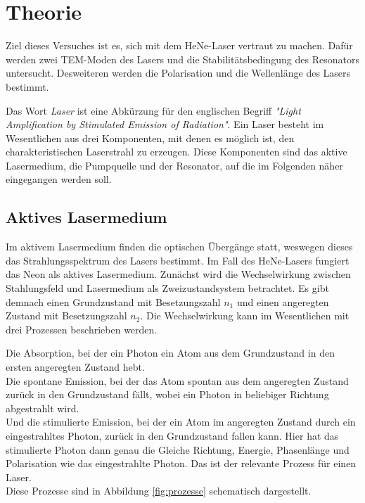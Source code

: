 \section{Theorie}
\label{sec:Theorie}

Ziel dieses Versuches ist es, sich mit dem HeNe-Laser vertraut zu machen. Dafür werden zwei TEM-Moden des Lasers und die
Stabilitätsbedingung des Resonators untersucht. Desweiteren werden die Polarisation und die Wellenlänge des Lasers bestimmt. 

Das Wort \textit{Laser} ist eine Abkürzung für den englischen Begriff \textit{"Light Amplification by Stimulated Emission
of Radiation"}. Ein Laser besteht im Wesentlichen aus drei Komponenten, mit denen es möglich ist, den charakteristischen Laserstrahl zu
erzeugen. Diese Komponenten sind das aktive Lasermedium, die Pumpquelle und der Resonator, auf die im Folgenden näher 
eingegangen werden soll. 

\subsection{Aktives Lasermedium}

Im aktivem Lasermedium finden die optischen Übergänge statt, weswegen dieses das Strahlungsspektrum des Lasers bestimmt. Im Fall des
HeNe-Lasers fungiert das Neon als aktives Lasermedium. Zunächst wird die Wechselwirkung zwischen Stahlungsfeld und Lasermedium als 
Zweizustandsystem betrachtet. Es gibt demnach einen Grundzustand mit Besetzungszahl $n_1$ und einen angeregten Zustand mit Besetzungszahl
$n_2$. Die Wechselwirkung kann im Wesentlichen mit drei Prozessen beschrieben werden.

Die Absorption, bei der ein Photon ein Atom aus dem Grundzustand in den ersten angeregten Zustand hebt. \\
Die spontane Emission, bei der das Atom spontan aus dem angeregten Zustand zurück in den Grundzustand fällt, wobei ein Photon in 
beliebiger Richtung abgestrahlt wird. \\
Und die stimulierte Emission, bei der ein Atom im angeregten Zustand durch ein eingestrahltes Photon, zurück in den Grundzustand 
fallen kann. Hier hat das stimulierte Photon dann genau die Gleiche Richtung, Energie, Phasenlänge und Polarisation wie das 
eingestrahlte Photon. Das ist der relevante Prozess für einen Laser. \\
Diese Prozesse sind in Abbildung \ref{fig:prozesse} schematisch dargestellt. 

